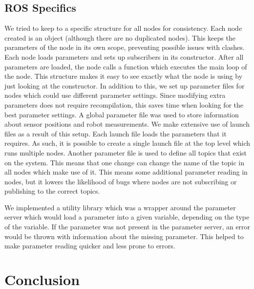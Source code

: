 \documentclass[10pt,a4paper]{article}
\begin{document}
\subsection{ROS Specifics}
We tried to keep to a specific structure for all nodes for consistency. Each
node created is an object (although there are no duplicated nodes). This keeps
the parameters of the node in its own scope, preventing possible issues with
clashes. Each node loads parameters and sets up subscribers in its constructor.
After all parameters are loaded, the node calls a function which executes the
main loop of the node. This structure makes it easy to see exactly what the node
is using by just looking at the constructor. In addition to this, we set up
parameter files for nodes which could use different parameter settings. Since
modifying extra parameters does not require recompilation, this saves time when
looking for the best parameter settings. A global parameter file was used to
store information about sensor positions and robot measurements. We make
extensive use of launch files as a result of this setup. Each launch file loads
the parameters that it requires. As such, it is possible to create a single
launch file at the top level which runs multiple nodes. Another parameter file
is used to define all topics that exist on the system. This means that one
change can change the name of the topic in all nodes which make use of it. This
means some additional parameter reading in nodes, but it lowers the likelihood
of bugs where nodes are not subscribing or publishing to the correct topics.

We implemented a utility library which was a wrapper around the parameter server
which would load a parameter into a given variable, depending on the type of the
variable. If the parameter was not present in the parameter server, an error
would be thrown with information about the missing parameter. This helped to
make parameter reading quicker and less prone to errors.

\section{Conclusion}

\nocite{*}
\printbibliography
\end{document}
